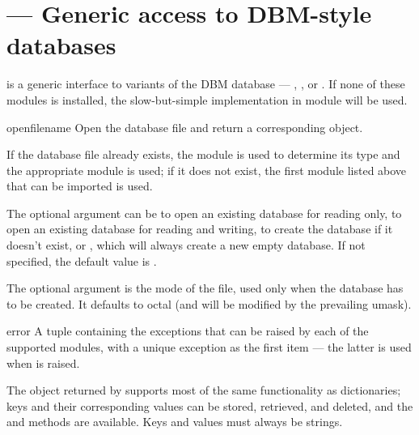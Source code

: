 \section{ ---
         Generic access to DBM-style databases}



 is a generic interface to variants of the DBM
database --- ,
, or
.  If none of these modules is
installed, the slow-but-simple implementation in module
 will be used.

\begin{funcdesc}{open}{filename}
Open the database file  and return a corresponding object.

If the database file already exists, the  module is 
used to determine its type and the appropriate module is used; if it
does not exist, the first module listed above that can be imported is
used.

The optional  argument can be
 to open an existing database for reading only,
 to open an existing database for reading and writing,
 to create the database if it doesn't exist, or
, which will always create a new empty database.  If not
specified, the default value is .

The optional  argument is the \UNIX{} mode of the file, used
only when the database has to be created.  It defaults to octal
 (and will be modified by the prevailing umask).
\end{funcdesc}

\begin{excdesc}{error}
A tuple containing the exceptions that can be raised by each of the
supported modules, with a unique exception  as
the first item --- the latter is used when  is
raised.
\end{excdesc}

The object returned by  supports most of the same
functionality as dictionaries; keys and their corresponding values can
be stored, retrieved, and deleted, and the  and
 methods are available.  Keys and values must always be
strings.


